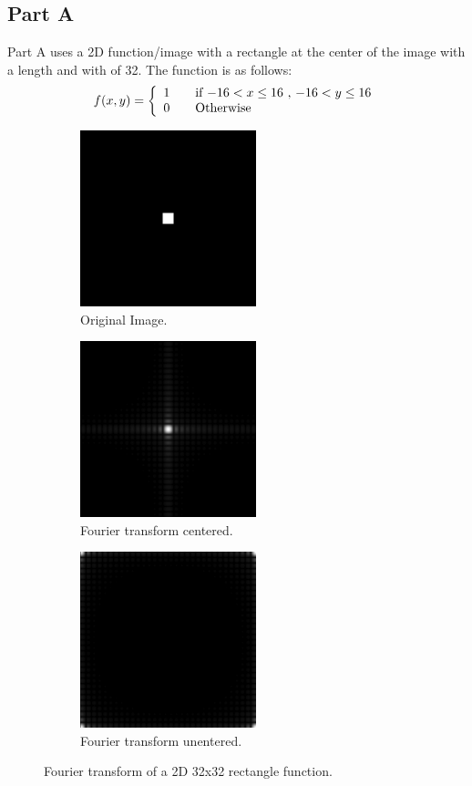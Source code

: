\documentclass[letter]{article}
\begin{document}
\subsection{Part A}
Part A uses a 2D function/image with a rectangle at the center of the image with a length and with of 32. The function is as follows: $$f(x,y) = \left \{ \begin{array}{l l} 1 & \quad \text{if $-16 < x \leq 16$ , $-16 < y \leq 16$}\\ 0 & \quad \text{Otherwise}\end{array} \right.$$

\begin{figure}[hbtp]
  \centering
  \begin{subfigure}{5.1cm}
    \includegraphics[width=5.1cm]{images/rect_512_32x32.png}
    \caption{Original Image.}
  \end{subfigure}
  \begin{subfigure}{5.1cm}
    \includegraphics[width=5.1cm]{images/rect_512_32x32_FU_centered.png}
    \caption{Fourier transform centered.}
  \end{subfigure}
  \begin{subfigure}{5.1cm}
    \includegraphics[width=5.1cm]{images/rect_512_32x32_FU.png}
    \caption{Fourier transform unentered.}
  \end{subfigure}
  \caption{Fourier transform of a 2D 32x32 rectangle function.}
  \label{fig:ft_3232}
\end{figure}
\end{document}
